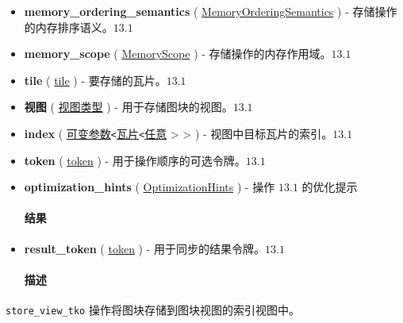 \documentclass{article}
\begin{document}
\begin{itemize}
\item \textbf{memory\_ordering\_semantics} ( \href{https://docs.nvidia.com/cuda/tile-ir/latest/sections/operations.html#op-attribute-cuda-tile-store-view-tko-memoryorderingsemantics-attr}{MemoryOrderingSemantics} ) - 存储操作的内存排序语义。$\boxed{13.1}$
\item \textbf{memory\_scope} ( \href{https://docs.nvidia.com/cuda/tile-ir/latest/sections/operations.html#op-attribute-cuda-tile-store-view-tko-memoryscope-attr}{MemoryScope} ) - 存储操作的内存作用域。$\boxed{13.1}$
\item \textbf{tile} ( \href{https://docs.nvidia.com/cuda/tile-ir/latest/sections/types.html#type-tile}{tile} ) - 要存储的瓦片。$\boxed{13.1}$
\item \textbf{视图} ( \href{https://docs.nvidia.com/cuda/tile-ir/latest/sections/operations.html#type-view-type}{视图类型} ) - 用于存储图块的视图。$\boxed{13.1}$
\item \textbf{index} ( \href{https://docs.nvidia.com/cuda/tile-ir/latest/sections/operations.html#type-variadic}{可变参数}\texttt{<}\href{https://docs.nvidia.com/cuda/tile-ir/latest/sections/types.html#type-tile}{瓦片}\texttt{<}\href{https://docs.nvidia.com/cuda/tile-ir/latest/sections/operations.html#type-any}{任意} > > ) - 视图中目标瓦片的索引。$\boxed{13.1}$
\item \textbf{token} ( \href{https://docs.nvidia.com/cuda/tile-ir/latest/sections/operations.html#type-token}{token} ) - 用于操作顺序的可选令牌。$\boxed{13.1}$
\item \textbf{optimization\_hints} ( \href{https://docs.nvidia.com/cuda/tile-ir/latest/sections/operations.html#op-attribute-cuda-tile-store-view-tko-optimizationhints-attr}{OptimizationHints} ) - 操作 $\boxed{13.1}$ 的优化提示




\paragraph{结果}


\item \textbf{result\_token} ( \href{https://docs.nvidia.com/cuda/tile-ir/latest/sections/operations.html#type-token}{token} ) - 用于同步的结果令牌。$\boxed{13.1}$




\paragraph{描述}


\end{itemize}
\texttt{store\_view\_tko} 操作将图块存储到图块视图的索引视图中。
\end{document}
